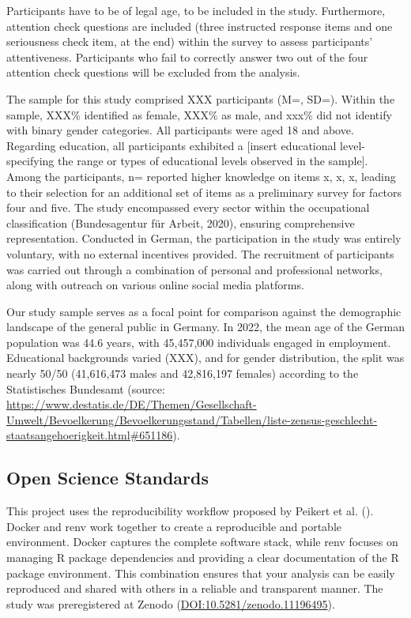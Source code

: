 \documentclass[
  12pt,
  a4paper,
  twoside]{article}
\begin{document}
Participants have to be of legal age, to be included in the study. Furthermore, attention check questions are included (three instructed response items and one seriousness check item, at the end) within the survey to assess participants' attentiveness. Participants who fail to correctly answer two out of the four attention check questions will be excluded from the analysis.

The sample for this study comprised XXX participants (M=, SD=). Within the sample, XXX\% identified as female, XXX\% as male, and xxx\% did not identify with binary gender categories. All participants were aged 18 and above. Regarding education, all participants exhibited a {[}insert educational level- specifying the range or types of educational levels observed in the sample{]}. Among the participants, n= reported higher knowledge on items x, x, x, leading to their selection for an additional set of items as a preliminary survey for factors four and five.
The study encompassed every sector within the occupational classification (Bundesagentur für Arbeit, 2020), ensuring comprehensive representation. Conducted in German, the participation in the study was entirely voluntary, with no external incentives provided. The recruitment of participants was carried out through a combination of personal and professional networks, along with outreach on various online social media platforms.

Our study sample serves as a focal point for comparison against the demographic landscape of the general public in Germany. In 2022, the mean age of the German population was 44.6 years, with 45,457,000 individuals engaged in employment. Educational backgrounds varied (XXX), and for gender distribution, the split was nearly 50/50 (41,616,473 males and 42,816,197 females) according to the Statistisches Bundesamt (source: \url{https://www.destatis.de/DE/Themen/Gesellschaft-Umwelt/Bevoelkerung/Bevoelkerungsstand/Tabellen/liste-zensus-geschlecht-staatsangehoerigkeit.html\#651186}).

\subsection{Open Science Standards}\label{open-science-standards}

This project uses the reproducibility workflow proposed by Peikert et al. (). Docker and renv work together to create a reproducible and portable
environment. Docker captures the complete software stack, while renv focuses on
managing R package dependencies and providing a clear documentation of the R
package environment. This combination ensures that your analysis can be easily
reproduced and shared with others in a reliable and transparent manner.
The study was preregistered at Zenodo (\url{DOI:10.5281/zenodo.11196495}).
\end{document}
